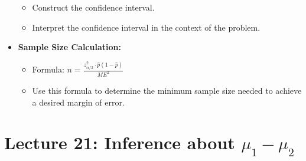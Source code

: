 \documentclass{article}
\begin{document}
\begin{multicols}{2}
\begin{itemize}
\begin{itemize}
        \item Construct the confidence interval.
        \item Interpret the confidence interval in the context of the problem.
    \end{itemize}
\item \textbf{Sample Size Calculation:}
    \begin{itemize}
        \item Formula: $n = \frac{z_{\alpha/2}^2 \cdot \hat{p}(1-\hat{p})}{ME^2}$
        \item Use this formula to determine the minimum sample size needed to achieve a desired margin of error.
    \end{itemize}
\end{itemize}

\section*{Lecture 21: Inference about $\mu_1 - \mu_2$}


\end{multicols}
\end{document}

